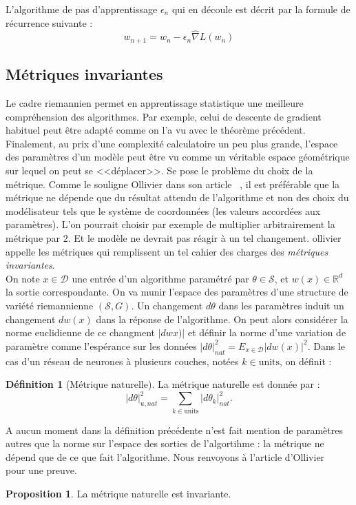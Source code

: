 \documentclass{article}
\theoremstyle{definition}
\newtheorem{definition}{Définition}
\newtheorem{prop}{Proposition}
\newcommand{\R}{\mathbb R}
\begin{document}
L'algorithme de pas d'apprentissage $\epsilon_n$ qui en découle est décrit par la formule de récurrence suivante :
\[w_{n+1}=w_n -\epsilon_n \hat{\nabla} L(w_n)\] 

\subsection{Métriques invariantes}

Le cadre riemannien permet en apprentissage statistique une meilleure compréhension des algorithmes. Par exemple, celui de descente de gradient habituel peut être adapté comme on l'a vu avec le théorème précédent. Finalement, au prix d'une complexité calculatoire un peu plus grande, l'espace des paramètres d'un modèle peut être vu comme un véritable espace géométrique sur lequel on peut se <<déplacer>>. Se pose le problème du choix de la métrique. Comme le souligne Ollivier dans son article ~\cite{Ollivier}, il est préférable que la métrique ne dépende que du résultat attendu de l'algorithme et non des choix du modélisateur tels que le système de coordonnées (les valeurs accordées aux paramètres). L'on pourrait choisir par exemple de multiplier arbitrairement la métrique par $2$. Et le modèle ne devrait pas réagir à un tel changement. ollivier appelle les métriques qui remplissent un tel cahier des charges des \textit{métriques invariantes}.\\

On note $x\in \mathcal D$ une entrée d'un algorithme paramétré par $\theta \in \mathcal S$, et $w(x)\in \R^d$ la sortie correspondante. On va munir l'espace des paramètres d'une structure de variété riemannienne $(\mathcal S, G)$. Un changement $d\theta$ dans les paramètres induit un changement $dw(x)$ dans la réponse de l'algorithme. On peut alors considérer la norme euclidienne de ce changment $|dwx)|$ et définir la norme d'une variation de paramètre comme l'espérance sur les données $|d\theta|_{nat}^2=E_{x\in \mathcal D}|dw(x)|^2$. Dans le cas d'un réseau de neurones à plusieurs couches, notées $k\in \text{units}$, on définit :
\begin{definition}[Métrique naturelle]
La métrique naturelle est donnée par :
\[|d\theta|_{u,nat}^2=\sum_{k\in\text{units}} |d\theta_k|_{nat}^2.\]
\end{definition}

A aucun moment dans la définition précédente n'est fait mention de paramètres autres que la norme sur l'espace des sorties de l'algortihme : la métrique ne dépend que de ce que fait l'algorithme. Nous renvoyons à l'article d'Ollivier ~\cite{Ollivier} pour une preuve.
\begin{prop}
La métrique naturelle est invariante.
\end{prop}
\end{document}
